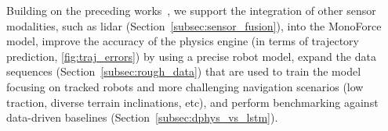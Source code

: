 Building on the preceding works~\cite{agishev2024monoforce, agishev2024endtoend},
we support the integration of other sensor modalities, such as lidar (Section~\ref{subsec:sensor_fusion}), into the MonoForce model,
improve the accuracy of the physics engine (in terms of trajectory prediction, \autoref{fig:traj_errors}) by using a precise robot model,
expand the data sequences (Section~\ref{subsec:rough_data}) that are used to train the model
focusing on tracked robots and more challenging navigation scenarios (low traction, diverse terrain inclinations, etc),
and perform benchmarking against data-driven baselines (Section~\ref{subsec:dphys_vs_lstm}).
